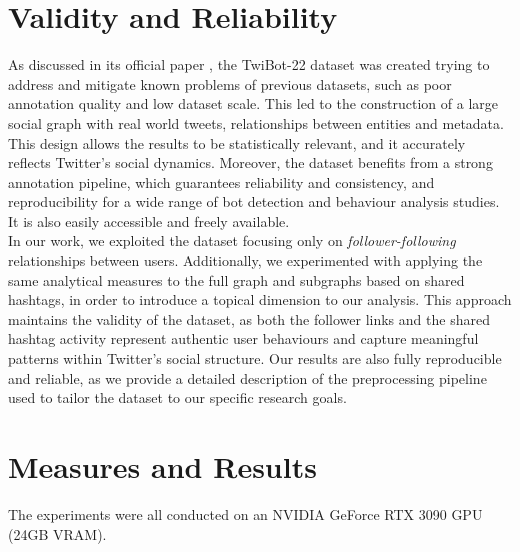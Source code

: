 \documentclass[12pt, a4paper]{article}
\begin{document}
\section{Validity and Reliability}
	\label{validity-and-reliability-not-needed-for-the-project-proposal}
	As discussed in its official paper \cite{twibot22}, the TwiBot-22 dataset was created trying to address and mitigate known problems of previous datasets, such as poor annotation quality and low dataset scale. This led to the construction of a large social graph with real world tweets, relationships between entities and metadata. This design allows the results to be statistically relevant, and it accurately reflects Twitter’s social dynamics. Moreover, the dataset benefits from a strong annotation pipeline, which guarantees reliability and consistency, and reproducibility for a wide range of bot detection and behaviour analysis studies. It is also easily accessible and freely available.\\
    In our work, we exploited the dataset focusing only on \textit{follower-following} relationships between users. Additionally, we experimented with applying the same analytical measures to the full graph and subgraphs based on shared hashtags, in order to introduce a topical dimension to our analysis. This approach maintains the validity of the dataset, as both the follower links and the shared hashtag activity represent authentic user behaviours and capture meaningful patterns within Twitter’s social structure. Our results are also fully reproducible and reliable, as we provide a detailed description of the preprocessing pipeline used to tailor the dataset to our specific research goals.


\section{Measures and Results}
	\label{measures}
	The experiments were all conducted on an NVIDIA GeForce RTX 3090 GPU (24GB VRAM).
\end{document}
